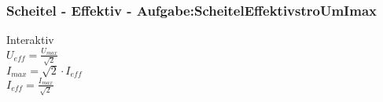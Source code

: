 \subsubsection{Scheitel - Effektiv  - Aufgabe:ScheitelEffektivstroUmImax} 
\begin{minipage}{0.45\textwidth} 
Interaktiv\\ 
$ U_{eff}  = \frac{U_{max} }{\sqrt{2}} $\\ 
$ I_{max}  = \sqrt{2}\cdot I_{eff} $\\ 
$ I_{eff}  = \frac{I_{max} }{\sqrt{2}} $\\ 
\end{minipage} 
\begin{minipage}{0.45\textwidth} 
 
\end{minipage} 
